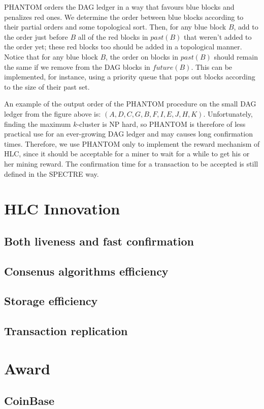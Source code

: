 \documentclass[a4paper,11pt]{article}
\begin{document}
PHANTOM orders the DAG ledger in a way that favours blue blocks and penalizes
red ones. We determine the order between blue blocks according to their partial
orders and some topological sort. Then, for any blue block $B$, add to the order
just before $B$ all of the red blocks in $past(B)$ that weren’t added to the
order yet; these red blocks too should be added in a topological manner. Notice
that for any blue block $B$, the order on blocks in $past(B)$ should remain the
same if we remove from the DAG blocks in $future(B)$. This can be implemented,
for instance, using a priority queue that pops out blocks according to the size
of their past set.

An example of the output order of the PHANTOM procedure on the small DAG ledger
from the figure above is: $(A,D,C,G,B,F,I,E,J,H,K)$. Unfortunately, finding the
maximum $k$-cluster is NP hard, so PHANTOM is therefore of less practical use
for an ever-growing DAG ledger and may causes long confirmation times.
Therefore, we use PHANTOM only to implement the reward mechanism of HLC, since
it should be acceptable for a miner to wait for a while to get his or her mining
reward. The confirmation time for a transaction to be accepted is still defined
in the SPECTRE way.

\section{HLC Innovation}
\subsection{Both liveness and fast confirmation} 
\subsection{Consenus algorithms efficiency} 
\subsection{Storage efficiency} 
\subsection{Transaction replication} 

\section{Award}
\subsection{CoinBase}
\end{document}
